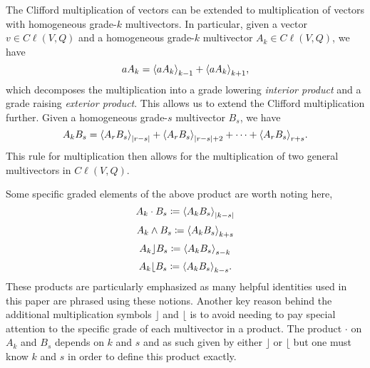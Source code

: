 The Clifford multiplication of vectors can be extended to multiplication of vectors with homogeneous grade-$k$ multivectors.  In particular, given a vector $v \in C\ell(V,Q)$ and a homogeneous grade-$k$ multivector $A_k \in C\ell(V,Q)$, we have
\begin{equation}
\label{eq:vector_multiplication}
aA_k = \proj{k-1}{aA_k} + \proj{k+1}{aA_k},
\end{equation}
which decomposes the multiplication into a grade lowering \emph{interior product} and a grade raising \emph{exterior product}.  This allows us to extend the Clifford multiplication further. Given a homogeneous grade-$s$ multivector $B_s$, we have
\begin{equation}
\label{eq:general_clifford_multiplication}
A_k B_s = \proj{|r-s|}{A_rB_s} + \proj{|r-s|+2}{A_rB_s} + \cdots + \proj{r+s}{A_rB_s}.
\end{equation}
This rule for multiplication then allows for the multiplication of two general multivectors in $C\ell(V,Q)$. 

Some specific graded elements of the above product are worth noting here, 
\begin{equation}
    A_k \cdot B_s \coloneqq \proj{|k-s|}{A_k B_s}
\end{equation}
\begin{equation}
    A_k \wedge B_s \coloneqq \proj{k+s}{A_k B_s}
\end{equation}
\begin{equation}
\label{eq:left_contraction}
    A_k \rfloor B_s \coloneqq \proj{s-k}{A_k B_s}
\end{equation}
\begin{equation}
\label{eq:right_contraction}
    A_k \lfloor B_s \coloneqq \proj{k-s}{A_k B_s}.
\end{equation}
These products are particularly emphasized as many helpful identities used in this paper are phrased using these notions. Another key reason behind the additional multiplication symbols $\rfloor$ and $\lfloor$ is to avoid needing to pay special attention to the specific grade of each multivector in a product.  The product $\cdot$ on $A_k$ and $B_s$ depends on $k$ and $s$ and as such given by either $\rfloor$ or $\lfloor$ but one must know $k$ and $s$ in order to define this product exactly. 

